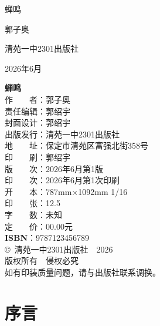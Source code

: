 \documentclass[UTF8, zihao=2, oneside]{ctexbook}
\newcommand{\booktitle}{蝉鸣}
\newcommand{\bookauthor}{郭子奥}
\newcommand{\publisher}{清苑一中2301出版社}
\newcommand{\publishdate}{2026年6月}
\newcommand{\isbn}{9787123456789}
\begin{document}
\begin{titlepage}
    \centering
    \vspace*{2cm}
    { \heiti \booktitle \par}
    \vspace{1cm}
    { \bookauthor \par}
    \vspace{8cm}
    { \publisher \par}
    \vspace{0.5cm}
    { \publishdate \par}
    \vfill
\end{titlepage}
\newpage
\thispagestyle{empty}
\vspace*{2cm}
\begin{flushleft}
    \textbf{\booktitle}\\[0.5cm]
    作　　者：\bookauthor\\[0.3cm]
    责任编辑：郭绍宇\\[0.3cm]
    封面设计：郭绍宇\\[0.3cm]
    出版发行：\publisher \\[0.3cm]
    地　　址：保定市清苑区富强北街358号\\[0.3cm]
    印　　刷：郭绍宇\\[0.3cm]
    版　　次：2026年6月第1版\\[0.3cm]
    印　　次：2026年6月第1次印刷\\[0.3cm]
    开　　本：787mm×1092mm 1/16\\[0.3cm]
    印　　张：12.5\\[0.3cm]
    字　　数：未知\\[0.3cm]
    定　　价：00.00元\\[0.6cm]
    \textbf{ISBN}：\isbn \\[1cm]
    \copyright\ \publisher\ \ 2026\\[0.5cm]
    版权所有　侵权必究\\[0.2cm]
    如有印装质量问题，请与出版社联系调换。
\end{flushleft}

\frontmatter
\pagestyle{plain}
\tableofcontents

\chapter*{序言}
\thispagestyle{empty}
\end{document}
